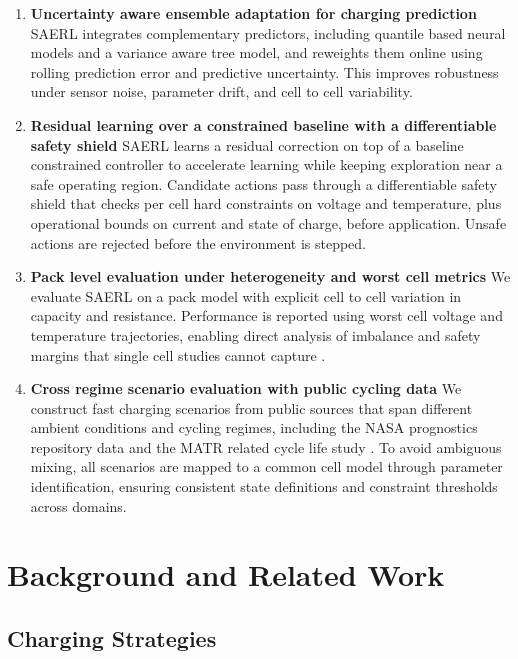 \documentclass[%
 aip,
 amsmath,amssymb,
reprint, onecolumn %
]{revtex4-1}
\begin{document}
\begin{enumerate}
\item \textbf{Uncertainty aware ensemble adaptation for charging prediction}
SAERL integrates complementary predictors, including quantile based neural models and a variance aware tree model, and reweights them online using rolling prediction error and predictive uncertainty. This improves robustness under sensor noise, parameter drift, and cell to cell variability.

\item \textbf{Residual learning over a constrained baseline with a differentiable safety shield}
SAERL learns a residual correction on top of a baseline constrained controller to accelerate learning while keeping exploration near a safe operating region. Candidate actions pass through a differentiable safety shield that checks per cell hard constraints on voltage and temperature, plus operational bounds on current and state of charge, before application. Unsafe actions are rejected before the environment is stepped.

\item \textbf{Pack level evaluation under heterogeneity and worst cell metrics}
We evaluate SAERL on a pack model with explicit cell to cell variation in capacity and resistance. Performance is reported using worst cell voltage and temperature trajectories, enabling direct analysis of imbalance and safety margins that single cell studies cannot capture \cite{xin2024machines}.

\item \textbf{Cross regime scenario evaluation with public cycling data}
We construct fast charging scenarios from public sources that span different ambient conditions and cycling regimes, including the NASA prognostics repository data \cite{saha2008} and the MATR related cycle life study \cite{severson2019}. To avoid ambiguous mixing, all scenarios are mapped to a common cell model through parameter identification, ensuring consistent state definitions and constraint thresholds across domains.
\end{enumerate}

\section{\label{sec:related-work}Background and Related Work}

\subsection{\label{subsec:charging-strategies}Charging Strategies}
\end{document}
